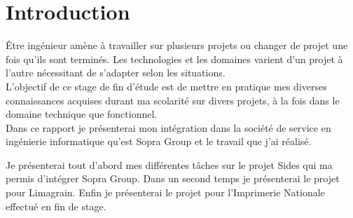 \cleardoublepage

\chapter*{Introduction}




Être ingénieur amène à travailler sur plusieurs projets ou changer de projet une fois qu'ils sont terminés.
Les technologies et les domaines varient d'un projet à l'autre nécessitant de s'adapter selon les situations.
\\



L'objectif de ce stage de fin d'étude est de mettre en pratique mes diverses connaissances acquises durant ma scolarité sur divers projets, à la fois dans le domaine technique que fonctionnel.
\\


Dans ce rapport je présenterai mon intégration dans la société de service en ingénierie informatique qu'est Sopra Group et le travail que j'ai réalisé.

Je présenterai tout d'abord mes différentes tâches sur le projet Sides qui ma permis d'intégrer Sopra Group.
Dans un second temps je présenterai le projet pour Limagrain.
Enfin je présenterai le projet pour l'Imprimerie Nationale effectué en fin de stage.